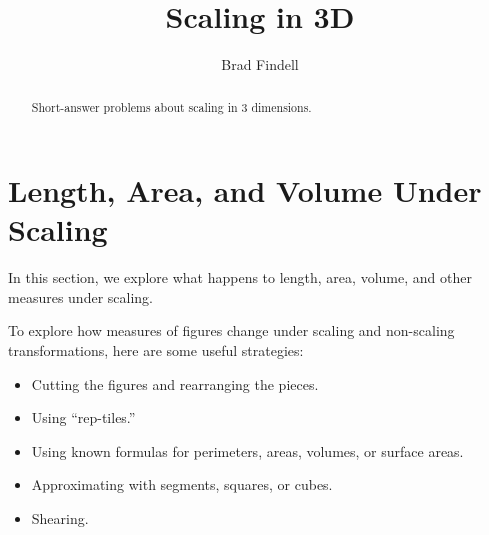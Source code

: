 \documentclass[nooutcomes]{ximera}
\title{Scaling in 3D}
\author{Brad Findell}
\begin{document}
\begin{abstract}
Short-answer problems about scaling in 3 dimensions. 
\end{abstract}
\maketitle




\section{Length, Area, and Volume Under Scaling}
In this section, we explore what happens to length, area, volume, and other measures under scaling.  

To explore how measures of figures change under scaling and non-scaling transformations, here are some useful strategies: 
\begin{itemize}
\item Cutting the figures and rearranging the pieces.  
\item Using ``rep-tiles.'' 
\item Using known formulas for perimeters, areas, volumes, or surface areas. 
\item Approximating with segments, squares, or cubes.  
\item Shearing. 
\end{itemize}

\end{document}
